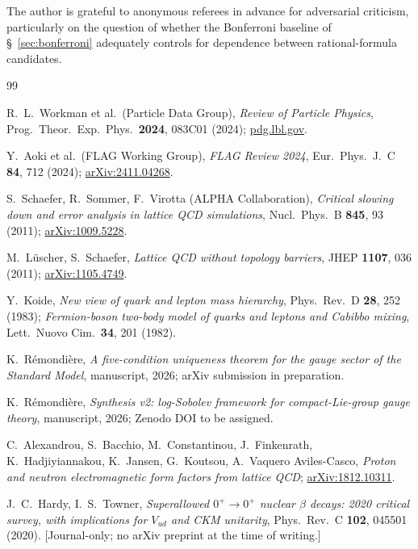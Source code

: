 \documentclass[aps,prl,reprint,amsmath,amssymb,nofootinbib,floatfix,superscriptaddress]{revtex4-2}
\begin{document}
The author is grateful to anonymous referees in advance for adversarial criticism, particularly on the question of whether the Bonferroni baseline of \S~\ref{sec:bonferroni} adequately controls for dependence between rational-formula candidates.

\begin{thebibliography}{99}

R.~L.~Workman et al.\ (Particle Data Group),
\emph{Review of Particle Physics},
Prog.\ Theor.\ Exp.\ Phys.\ \textbf{2024}, 083C01 (2024);
\href{https://pdg.lbl.gov}{pdg.lbl.gov}.

Y.~Aoki et al.\ (FLAG Working Group),
\emph{FLAG Review 2024},
Eur.\ Phys.\ J.\ C \textbf{84}, 712 (2024);
\href{https://arxiv.org/abs/2411.04268}{arXiv:2411.04268}.

S.~Schaefer, R.~Sommer, F.~Virotta (ALPHA Collaboration),
\emph{Critical slowing down and error analysis in lattice QCD simulations},
Nucl.\ Phys.\ B \textbf{845}, 93 (2011);
\href{https://arxiv.org/abs/1009.5228}{arXiv:1009.5228}.

M.~L\"uscher, S.~Schaefer,
\emph{Lattice QCD without topology barriers},
JHEP \textbf{1107}, 036 (2011);
\href{https://arxiv.org/abs/1105.4749}{arXiv:1105.4749}.

Y.~Koide,
\emph{New view of quark and lepton mass hierarchy},
Phys.\ Rev.\ D \textbf{28}, 252 (1983);
\emph{Fermion-boson two-body model of quarks and leptons and Cabibbo mixing},
Lett.\ Nuovo Cim.\ \textbf{34}, 201 (1982).

K.~R\'emondi\`ere,
\emph{A five-condition uniqueness theorem for the gauge sector of the Standard Model},
manuscript, 2026; arXiv submission in preparation.

K.~R\'emondi\`ere,
\emph{Synthesis v2: log-Sobolev framework for compact-Lie-group gauge theory},
manuscript, 2026; Zenodo DOI to be assigned.

C.~Alexandrou, S.~Bacchio, M.~Constantinou, J.~Finkenrath, K.~Hadjiyiannakou, K.~Jansen, G.~Koutsou, A.~Vaquero Aviles-Casco,
\emph{Proton and neutron electromagnetic form factors from lattice QCD};
\href{https://arxiv.org/abs/1812.10311}{arXiv:1812.10311}.

J.~C.~Hardy, I.~S.~Towner,
\emph{Superallowed $0^+ \to 0^+$ nuclear $\beta$ decays: 2020 critical survey, with implications for $V_{ud}$ and CKM unitarity},
Phys.\ Rev.\ C \textbf{102}, 045501 (2020). [Journal-only; no arXiv preprint at the time of writing.]


\end{thebibliography}
\end{document}
